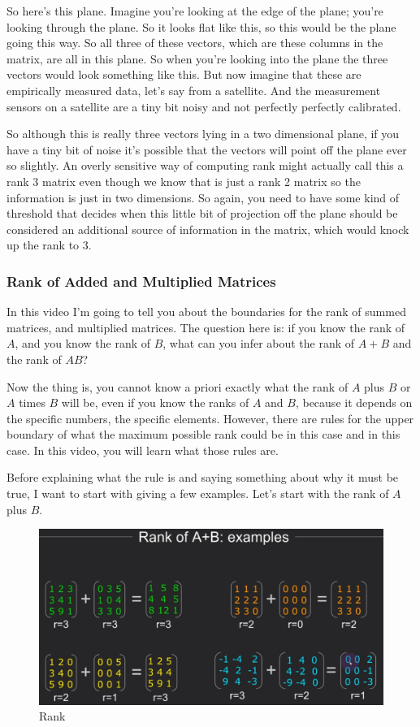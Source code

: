 \documentclass[fleqn,10pt]{olplainarticle}
\theoremstyle{definition}
\theoremstyle{remark}
\begin{document}
So here's this plane. Imagine you're looking at the edge of the plane; you're looking through the plane. So it looks flat like this, so this would be the plane going this way. So all three of these vectors, which are these columns in the matrix, are all in this plane. So when you're looking into the plane the three vectors would look something like this. But now imagine that these are empirically measured data, let's say from a satellite. And the measurement sensors on a satellite are a tiny bit noisy and not perfectly perfectly calibrated.

So although this is really three vectors lying in a two dimensional plane, if you have a tiny bit of noise it's possible that the vectors will point off the plane ever so slightly. An overly sensitive way of computing rank might actually call this a rank 3 matrix even though we know that is just a rank 2 matrix so the information is just in two dimensions. So again, you need to have some kind of threshold that decides when this little bit of projection off the plane should be considered an additional source of information in the matrix, which would knock up the rank to 3.

\pagebreak

\subsubsection*{Rank of Added and Multiplied Matrices}

In this video I'm going to tell you about the boundaries for the rank of summed matrices, and multiplied matrices. The question here is: if you know the rank of $A$, and you know the rank of $B$, what can you infer about the rank of $A + B$ and the rank of $AB$?

Now the thing is, you cannot know a priori exactly what the rank of $A$ plus $B$ or $A$ times $B$ will be, even if you know the ranks of $A$ and $B$, because it depends on the specific numbers, the specific elements. However, there are rules for the upper boundary of what the maximum possible rank could be in this case and in this case. In this video, you will learn what those rules are.

Before explaining what the rule is and saying something about why it must be true, I want to start with giving a few examples. Let's start with the rank of $A$ plus $B$.

\begin{figure}[ht]
	\centering
	\includegraphics[width=0.5\linewidth]{images/rank-18.png}
	\caption{Rank}
	\label{fig:rank_18}
\end{figure}
\end{document}
